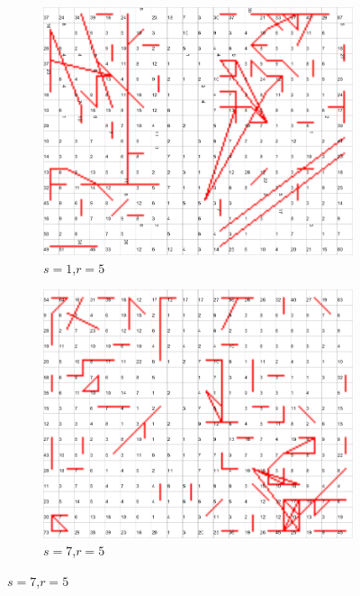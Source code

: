 \documentclass{acm_proc_article-sp}
\begin{document}
\begin{figure}
\centering
    \centering
    \begin{subfigure}[b]{0.30\linewidth}
        \includegraphics[width=\linewidth]{img/wine-newmid-radius-neighbourhood-graph--r-05-seed-1}
        \caption{$s=1$,$r=5$}
        \label{fig:wine-newmid-radius-neighbourhood-graph--r-05-seed-1}
    \end{subfigure}
    \begin{subfigure}[b]{0.30\linewidth}
        \includegraphics[width=\linewidth]{img/wine-newmid-radius-neighbourhood-graph--r-05-seed-7}
        \caption{$s=7$,$r=5$}

\end{subfigure}
\end{figure}
\end{document}
